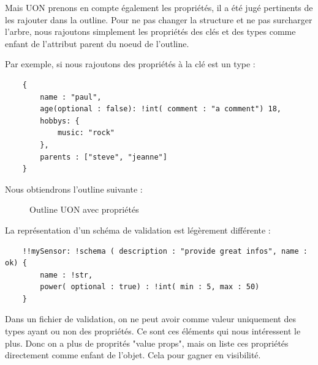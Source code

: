 \documentclass[
    iict, %
    il, %
]{heig-tb}
\begin{document}
Mais UON prenons en compte également les propriétés, il a été jugé pertinents de les rajouter dans la outline.
Pour ne pas changer la structure et ne pas surcharger l'arbre,
nous rajoutons simplement les propriétés des clés et des types comme enfant de l'attribut parent du noeud de l'outline.

Par exemple, si nous rajoutons des propriétés à la clé est un type :
\begin{lstlisting}
    {
        name : "paul",
        age(optional : false): !int( comment : "a comment") 18,
        hobbys: {
            music: "rock"
        },
        parents : ["steve", "jeanne"]
    }
\end{lstlisting}

Nous obtiendrons l'outline suivante :

\begin{figure}[!h]
    \begin{center}
    \end{center}
    \caption[Outline UON avec propriétés]{\label{uon-payload-outline-with-properties} Outline UON avec propriétés}
\end{figure}

La représentation d'un schéma de validation est légèrement différente :

\begin{lstlisting}
    !!mySensor: !schema ( description : "provide great infos", name : ok) {
        name : !str,
        power( optional : true) : !int( min : 5, max : 50)
    }
\end{lstlisting}

Dans un fichier de validation, on ne peut avoir comme valeur uniquement des types ayant ou non des propriétés. Ce sont ces éléments qui nous intéressent le plus.
Donc on a plus de proprités "value props", mais on liste ces propriétés directement comme enfant de l'objet. Cela pour gagner en visibilité.
\end{document}
